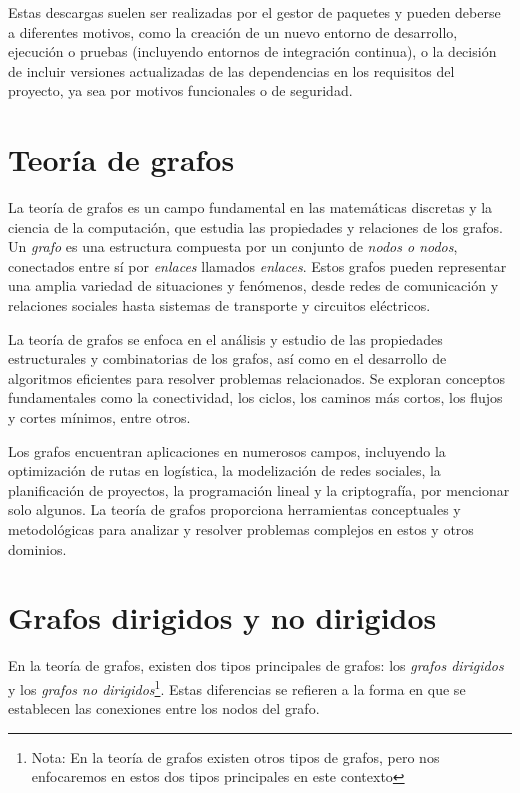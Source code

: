 Estas descargas suelen ser realizadas por el gestor de paquetes y pueden deberse a diferentes motivos,
como la creación de un nuevo entorno de desarrollo, ejecución o pruebas (incluyendo entornos de
integración continua), o la decisión de incluir versiones actualizadas de las dependencias en los
requisitos del proyecto, ya sea por motivos funcionales o de seguridad.

\section{Teoría de grafos}

La teoría de grafos es un campo fundamental en las matemáticas discretas y la ciencia de la computación,
que estudia las propiedades y relaciones de los grafos. Un \textit{grafo} es una estructura compuesta
por un conjunto de \textit{nodos o nodos}, conectados entre sí por \textit{enlaces} llamados \textit{enlaces}.
Estos grafos pueden representar una amplia variedad de situaciones y fenómenos, desde redes de
comunicación y relaciones sociales hasta sistemas de transporte y circuitos eléctricos.

La teoría de grafos se enfoca en el análisis y estudio de las propiedades estructurales y combinatorias
de los grafos, así como en el desarrollo de algoritmos eficientes para resolver problemas relacionados.
Se exploran conceptos fundamentales como la conectividad, los ciclos, los caminos más cortos, los flujos
y cortes mínimos, entre otros.

Los grafos encuentran aplicaciones en numerosos campos, incluyendo la optimización de rutas en
logística, la modelización de redes sociales, la planificación de proyectos, la programación lineal
y la criptografía, por mencionar solo algunos. La teoría de grafos proporciona herramientas conceptuales
y metodológicas para analizar y resolver problemas complejos en estos y otros dominios.

\section{Grafos dirigidos y no dirigidos}

En la teoría de grafos, existen dos tipos principales de grafos: los \textit{grafos dirigidos} y
los \textit{grafos no dirigidos}\footnote{Nota: En la teoría de grafos existen otros tipos de grafos,
    pero nos enfocaremos en estos dos tipos principales en este contexto}. Estas diferencias se
refieren a la forma en que se establecen las conexiones entre los nodos del grafo.

